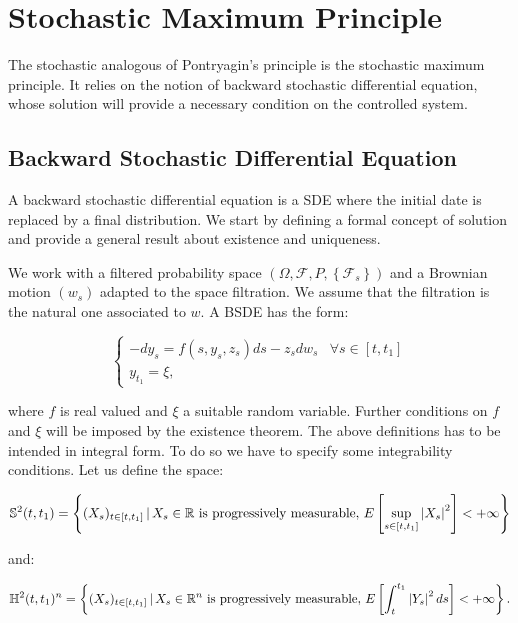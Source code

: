 \section{Stochastic Maximum Principle}

The stochastic analogous of Pontryagin's principle is the stochastic maximum principle. It relies on the notion of 
backward stochastic differential equation, whose solution will provide a necessary condition on the controlled system. 

\subsection{Backward Stochastic Differential Equation}

A backward stochastic differential equation is a SDE where the initial date is replaced by a final distribution. We 
start by defining a formal concept of solution and provide a general result about existence and uniqueness. 

We work with a filtered probability space $(\Omega,\mathcal{F}, P, \left\{\mathcal{F}_s\right\})$ and a Brownian motion $(w_s)$ adapted 
to the space filtration. We assume that the filtration is the natural one associated to $w$. A BSDE has the form:

\begin{equation}\label{2-3-defBSDE}
    \begin{cases}
        - dy_s = f(s,y_s,z_s)ds - z_sdw_s & \forall s\in[t,t_1]\\
        y_{t_1} = \xi, 
    \end{cases}
\end{equation}

where $f$ is real valued and $\xi$ a suitable random variable. Further conditions on $f$ and $\xi$ will be imposed 
by the existence theorem. The above definitions has to be intended in integral form. To do so we have to specify some integrability conditions. Let us define the space:

\begin{equation}\label{2-3-defS}
    \mathbb{S}^2(t,t_1) = \left\{(X_s)_{t\in[t,t_1]}\,|\, X_s\in\mathbb{R} \text{ is progressively measurable},\, E\left[\sup_{s\in[t,t_1]}\abs{X_s}^2\right]<+\infty\right\}
\end{equation}

and:

\begin{equation}\label{2-3-defH}
    \mathbb{H}^2(t,t_1)^n = \left\{(X_s)_{t\in[t,t_1]}\,|\, X_s\in\mathbb{R}^n \text{ is progressively measurable},\, E\left[\int_t^{t_1} \abs{Y_s}^2\,ds\right]<+\infty\right\}.    
\end{equation}

